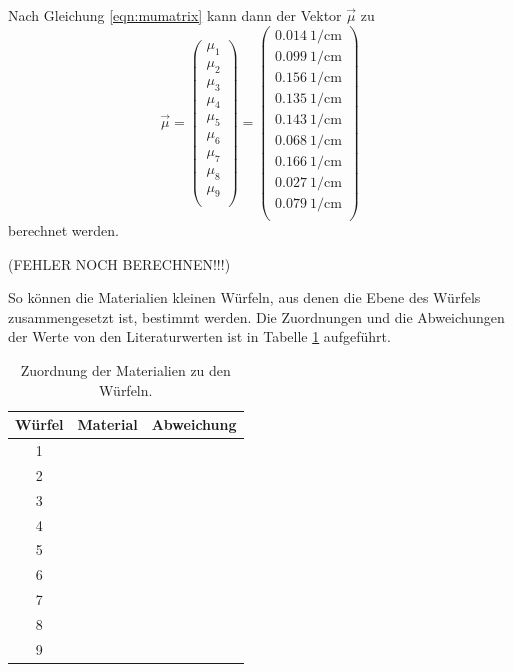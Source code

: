 Nach Gleichung \eqref{eqn:mumatrix} kann dann der Vektor $\vec{\mu}$ zu
\begin{equation*}
  \vec{\mu}=
  \left(
      \begin{array}{r}
        \mu_1 \\
        \mu_2 \\
        \mu_3 \\
        \mu_4 \\
        \mu_5 \\
        \mu_6 \\
        \mu_7 \\
        \mu_8 \\
        \mu_9 \\
      \end{array}
      \right)=
  \left(
      \begin{array}{r}
        \SI{0.014}{1\per\centi\metre} \\
        \SI{0.099}{1\per\centi\metre} \\
        \SI{0.156}{1\per\centi\metre} \\
        \SI{0.135}{1\per\centi\metre} \\
        \SI{0.143}{1\per\centi\metre} \\
        \SI{0.068}{1\per\centi\metre} \\
        \SI{0.166}{1\per\centi\metre} \\
        \SI{0.027}{1\per\centi\metre} \\
        \SI{0.079}{1\per\centi\metre} \\
      \end{array}
      \right)
\end{equation*}
berechnet werden.

(FEHLER NOCH BERECHNEN!!!)

So können die Materialien kleinen Würfeln, aus denen die Ebene des Würfels zusammengesetzt ist, bestimmt werden. Die Zuordnungen und die Abweichungen der Werte von den Literaturwerten ist in Tabelle \ref{tab:ergebnisse2} aufgeführt.


\begin{table}[htp]
	\begin{center}
    \caption{Zuordnung der Materialien zu den Würfeln.}
    \label{tab:ergebnisse2}
		\begin{tabular}{ccc}
		\toprule
			{Würfel} & {Material}  & {Abweichung} \\
			\midrule
			1 &  & \\
			2 &  & \\
			3 &  & \\
			4 &  & \\
			5 &  & \\
			6 &  & \\
			7 &  & \\
			8 &  & \\
			9 &  & \\
		\bottomrule
		\end{tabular}
	\end{center}
\end{table}
